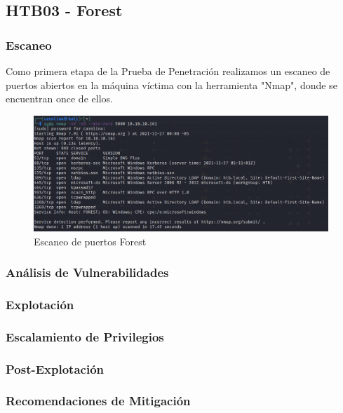 \subsection{HTB03 - Forest}

    \subsubsection{Escaneo}
        \large{Como primera etapa de la Prueba de Penetración realizamos un escaneo de puertos abiertos en la máquina víctima con la herramienta "Nmap", donde se encuentran once de ellos.}
        \par
        \begin{figure}[h!]
            \centering
            \includegraphics[width=0.99\textwidth]{imagenes/forest/nmap_forest.png}
            \caption{Escaneo de puertos Forest} 
        \end{figure}  

    \subsubsection{Análisis de Vulnerabilidades}

    \subsubsection{Explotación}

    \subsubsection{Escalamiento de Privilegios}

    \subsubsection{Post-Explotación}

    \subsubsection{Recomendaciones de Mitigación}
